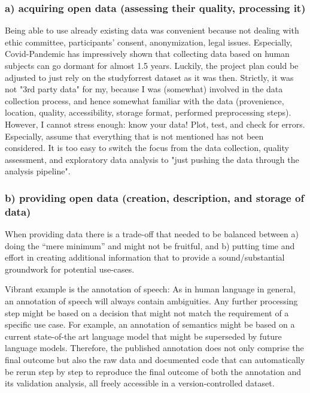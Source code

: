 



\subsubsection{a) acquiring open data (assessing their quality, processing it)}

%
Being able to use already existing data was convenient because not dealing with
ethic committee, participants' consent, anonymization, legal issues.
%
Especially, Covid-Pandemic has impressively shown that collecting data based on
human subjects can go dormant for almost 1.5 years.
%
Luckily, the project plan could be adjusted to just rely on the studyforrest
dataset as it was then.
%
Strictly, it was not "3rd party data" for my, because I was (somewhat) involved
in the data collection process, and hence somewhat familiar with the data
(provenience, location, quality, accessibility, storage format, performed
preprocessing steps).
%
However, I cannot stress enough: know your data! Plot, test, and check for
errors.
%
Especially, assume that everything that is not mentioned has not been
considered.
%
It is too easy to switch the focus from the data collection, quality assessment,
and exploratory data analysis to "just pushing the data through the analysis
pipeline".



\subsubsection{b) providing open data (creation, description, and storage of data)}



When providing data there is a trade-off that needed to be balanced between a)
doing the ``mere minimum'' and  might not be fruitful, and b) putting time and
effort in creating additional information that to provide a sound/substantial
groundwork for potential use-cases.

%
Vibrant example is the annotation of speech:
%
As in human language in general, an annotation of speech will always contain
ambiguities.
%
Any further processing step might be based on a decision that might not match
the requirement of a specific use case.
%
For example, an annotation of semantics might be based on a current state-of-the
art language model that might be superseded by future language models.
%
Therefore, the published annotation does not only comprise the final outcome but
also the raw data and documented code that can automatically be rerun step by
step to reproduce the final outcome of both the annotation and its validation
analysis, all freely accessible in a version-controlled dataset.

